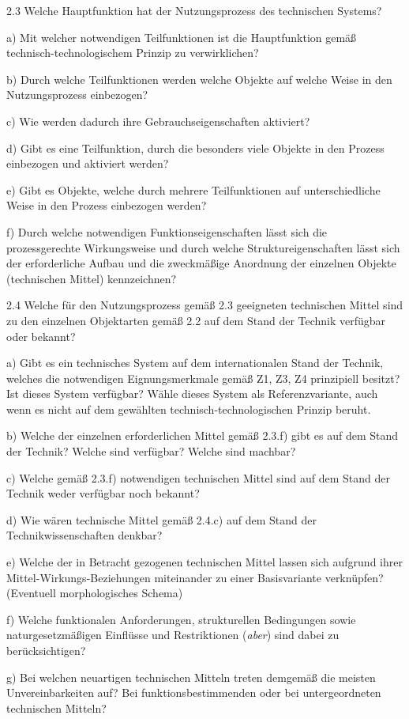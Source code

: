 \documentclass[12pt,a4paper]{article}
\begin{document}
2.3 Welche Hauptfunktion hat der Nutzungsprozess des technischen Systems?

a) Mit welcher notwendigen Teilfunktionen ist die Hauptfunktion gemäß
technisch-technologischem Prinzip zu verwirklichen?

b) Durch welche Teilfunktionen werden welche Objekte auf welche Weise in den
Nutzungsprozess einbezogen?

c) Wie werden dadurch ihre Gebrauchseigenschaften aktiviert?

d) Gibt es eine Teilfunktion, durch die besonders viele Objekte in den Prozess
einbezogen und aktiviert werden?

e) Gibt es Objekte, welche durch mehrere Teilfunktionen auf unterschiedliche
Weise in den Prozess einbezogen werden?

f) Durch welche notwendigen Funktionseigenschaften lässt sich die
prozessgerechte Wirkungsweise und durch welche Struktureigenschaften lässt sich
der erforderliche Aufbau und die zweckmäßige Anordnung der einzelnen Objekte
(technischen Mittel) kennzeichnen?

2.4 Welche für den Nutzungsprozess gemäß 2.3 geeigneten technischen Mittel sind
zu den einzelnen Objektarten gemäß 2.2 auf dem Stand der Technik verfügbar oder
bekannt?

a) Gibt es ein technisches System auf dem internationalen Stand der Technik,
welches die notwendigen Eignungsmerkmale gemäß Z1, Z3, Z4 prinzipiell besitzt?
Ist dieses System verfügbar? Wähle dieses System als Referenzvariante, auch
wenn es nicht auf dem gewählten technisch-technologischen Prinzip beruht.

b) Welche der einzelnen erforderlichen Mittel gemäß 2.3.f) gibt es auf dem
Stand der Technik? Welche sind verfügbar? Welche sind machbar?

c) Welche gemäß 2.3.f) notwendigen technischen Mittel sind auf dem Stand der
Technik weder verfügbar noch bekannt?

d) Wie wären technische Mittel gemäß 2.4.c) auf dem Stand der
Technikwissenschaften denkbar?

e) Welche der in Betracht gezogenen technischen Mittel lassen sich aufgrund
ihrer Mittel-Wirkungs-Beziehungen miteinander zu einer Basisvariante
verknüpfen? (Eventuell morphologisches Schema)

f) Welche funktionalen Anforderungen, strukturellen Bedingungen sowie
naturgesetzmäßigen Einflüsse und Restriktionen (\emph{aber}) sind dabei zu
berücksichtigen?
	
g) Bei welchen neuartigen technischen Mitteln treten demgemäß die meisten
Unvereinbarkeiten auf? Bei funktionsbestimmenden oder bei untergeordneten
technischen Mitteln?
\end{document}
